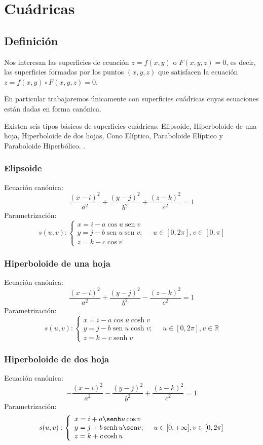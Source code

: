\chapter{Cuádricas}
\section{Definición}
Nos interesan las superficies de ecuación $z=f(x, y)$ o $F(x, y, z)=0$, es decir, las superficies formadas por los puntos $(x, y, z)$ que satisfacen la ecuación $z=f(x, y) \circ F(x, y, z)=0$.

En particular trabajaremos únicamente con superficies cuádricas cuyas ecuaciones están dadas en forma canónica.

Existen seis tipos básicos de superficies cuádricas: Elipsoide, Hiperboloide de una hoja, Hiperboloide de dos hojas, Cono Elíptico, Paraboloide Elíptico y Paraboloide Hiperbólico. \cite{solis2016graficas}.
\subsection{Elipsoide}
Ecuación canónica:
$$
    \frac{(x-i)^{2}}{a^{2}}+\frac{(y-j)^{2}}{b^{2}}+\frac{(z-k)^{2}}{c^{2}}=1
$$
Parametrización:
$$
    s(u, v):\left\{\begin{array}{l}
        x=i-a \cos u \operatorname{sen} v                 \\
        y=j-b \operatorname{sen} u \operatorname{sen} v ; \\
        z=k-c \cos v
    \end{array} \quad u \in[0,2 \pi], v \in[0, \pi]\right.
$$

\subsection{Hiperboloide de una hoja}
Ecuación canónica:
$$
    \frac{(x-i)^{2}}{a^{2}}+\frac{(y-j)^{2}}{b^{2}}-\frac{(z-k)^{2}}{c^{2}}=1
$$
Parametrización:
$$
    s(u, v):\left\{\begin{array}{l}
        x=i-a \cos u \cosh v                 \\
        y=j-b \operatorname{sen} u \cosh v ; \\
        z=k-c \operatorname{senh} v
    \end{array} \quad u \in[0,2 \pi], v \in \mathbb{R}\right.
$$

\subsection{Hiperboloide de dos hoja}
Ecuación canónica:
$$
    -\frac{(x-i)^{2}}{a^{2}}-\frac{(y-j)^{2}}{b^{2}}+\frac{(z-k)^{2}}{c^{2}}=1
$$
Parametrización:
$$
    s(u, v):\left\{\begin{array}{l}
        x=i+a \senh u \cos v                 \\
        y=j+b \operatorname{senh} u \sen v ; \\
        z=k+c \operatorname{cosh} u
    \end{array} \quad u \in[0, + \infty], v  \in[0,2 \pi] \right.
$$

